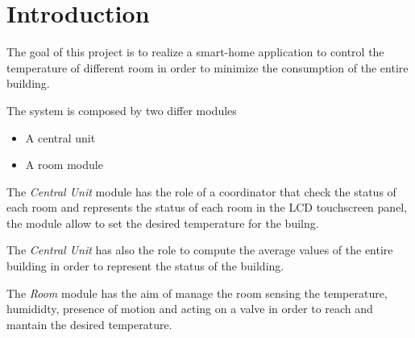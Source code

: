 \section{Introduction}
The goal of this project is to realize a smart-home application to control the temperature of different room in order to minimize the consumption of the entire building.

The system is composed by two differ modules
\begin{itemize}
	\item A central unit
	\item A room module
\end{itemize}

The \textit{Central Unit} module has the role of a coordinator that check the status of each room and represents the status 
of each room in the LCD touchscreen panel, the module allow to set the desired temperature for the builng.

The \textit{Central Unit} has also the role to compute the average values of the entire building 
in order to represent the status of the building.

The \textit{Room} module has the aim of manage the room sensing the temperature, humididty, presence of motion and acting on a valve 
in order to reach and mantain the desired temperature.
